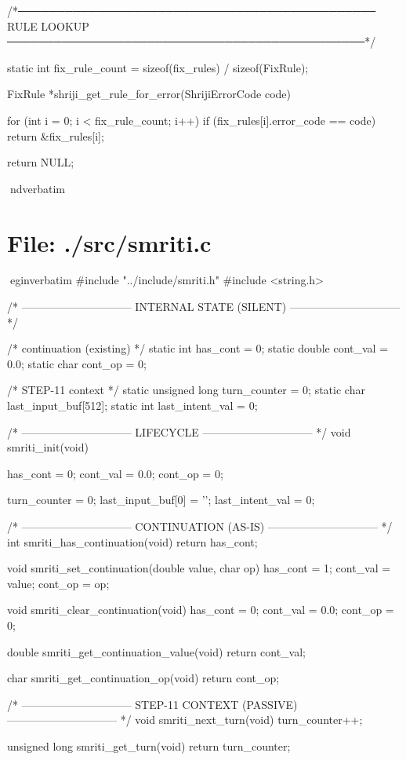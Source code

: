\documentclass{article}
\begin{document}
/*──────────────────────────────────────────────
    RULE LOOKUP
──────────────────────────────────────────────*/

static int fix_rule_count =
    sizeof(fix_rules) / sizeof(FixRule);

FixRule *shriji_get_rule_for_error(ShrijiErrorCode code)
{
    for (int i = 0; i < fix_rule_count; i++)
    {
        if (fix_rules[i].error_code == code)
            return &fix_rules[i];
    }

    return NULL;
}
nd{verbatim}
\section*{File: ./src/smriti.c}
egin{verbatim}
#include "../include/smriti.h"
#include <string.h>

/* ------------------------------
   INTERNAL STATE (SILENT)
   ------------------------------ */

/* continuation (existing) */
static int    has_cont = 0;
static double cont_val = 0.0;
static char   cont_op  = 0;

/* STEP-11 context */
static unsigned long turn_counter = 0;
static char last_input_buf[512];
static int  last_intent_val = 0;

/* ------------------------------
   LIFECYCLE
   ------------------------------ */
void smriti_init(void)
{
    has_cont = 0;
    cont_val = 0.0;
    cont_op  = 0;

    turn_counter = 0;
    last_input_buf[0] = '\0';
    last_intent_val = 0;
}

/* ------------------------------
   CONTINUATION (AS-IS)
   ------------------------------ */
int smriti_has_continuation(void)
{
    return has_cont;
}

void smriti_set_continuation(double value, char op)
{
    has_cont = 1;
    cont_val = value;
    cont_op  = op;
}

void smriti_clear_continuation(void)
{
    has_cont = 0;
    cont_val = 0.0;
    cont_op  = 0;
}

double smriti_get_continuation_value(void)
{
    return cont_val;
}

char smriti_get_continuation_op(void)
{
    return cont_op;
}

/* ------------------------------
   STEP-11 CONTEXT (PASSIVE)
   ------------------------------ */
void smriti_next_turn(void)
{
    turn_counter++;
}

unsigned long smriti_get_turn(void)
{
    return turn_counter;
}
\end{document}
